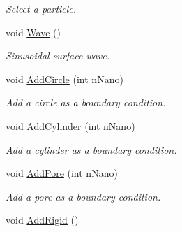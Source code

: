\begin{DoxyCompactItemize}
\begin{DoxyCompactList}\small\item\em \-Select a particle. \end{DoxyCompactList}\item 
\hypertarget{classForces_aea3ac235b677278906db133f4cfd54f4}{void \hyperlink{classForces_aea3ac235b677278906db133f4cfd54f4}{\-Wave} ()}\label{classForces_aea3ac235b677278906db133f4cfd54f4}

\begin{DoxyCompactList}\small\item\em \-Sinusoidal surface wave. \end{DoxyCompactList}\item 
\hypertarget{classForces_a3f2b57f5a0d64d4e41d00c90f0600717}{void \hyperlink{classForces_a3f2b57f5a0d64d4e41d00c90f0600717}{\-Add\-Circle} (int n\-Nano)}\label{classForces_a3f2b57f5a0d64d4e41d00c90f0600717}

\begin{DoxyCompactList}\small\item\em \-Add a circle as a boundary condition. \end{DoxyCompactList}\item 
\hypertarget{classForces_ad955b144c055a67de0e854e33894ed94}{void \hyperlink{classForces_ad955b144c055a67de0e854e33894ed94}{\-Add\-Cylinder} (int n\-Nano)}\label{classForces_ad955b144c055a67de0e854e33894ed94}

\begin{DoxyCompactList}\small\item\em \-Add a cylinder as a boundary condition. \end{DoxyCompactList}\item 
\hypertarget{classForces_a7689eeac5fe56921d52790bcf6344d1f}{void \hyperlink{classForces_a7689eeac5fe56921d52790bcf6344d1f}{\-Add\-Pore} (int n\-Nano)}\label{classForces_a7689eeac5fe56921d52790bcf6344d1f}

\begin{DoxyCompactList}\small\item\em \-Add a pore as a boundary condition. \end{DoxyCompactList}\item 
\hypertarget{classForces_adee9a7de583494983844ed4378f51df4}{void \hyperlink{classForces_adee9a7de583494983844ed4378f51df4}{\-Add\-Rigid} ()}\label{classForces_adee9a7de583494983844ed4378f51df4}


\end{DoxyCompactItemize}

